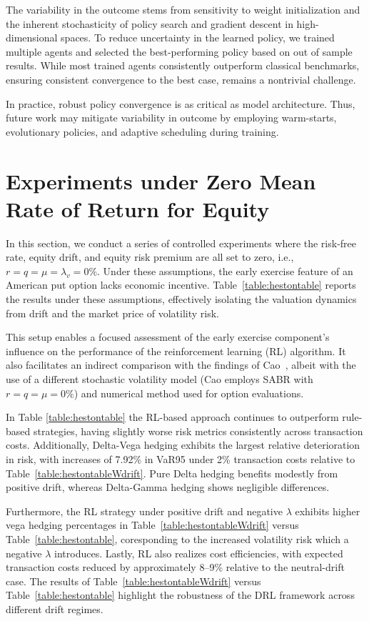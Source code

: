 \documentclass[a4paper,fleqn]{cas-dc}
\begin{document}
The variability in the outcome stems from sensitivity to weight initialization and the inherent stochasticity of policy search and gradient descent in high-dimensional spaces. To reduce uncertainty in the learned policy, we trained multiple agents and selected the best-performing policy based on out of sample results. While most trained agents consistently outperform classical benchmarks, ensuring consistent convergence to the best case, remains a nontrivial challenge. 

In practice, robust policy convergence is as critical as model architecture. Thus, future work may mitigate variability in outcome by employing warm-starts, evolutionary policies, and adaptive scheduling during training.


\section{Experiments under Zero Mean Rate of Return for Equity}\label{sec:experiments-with-zero-drift}

In this section, we conduct a series of controlled experiments where the risk-free rate, equity drift, and equity risk premium are all set to zero, i.e., $r=q=\mu=\lambda_{v}=0\%$. Under these assumptions, the early exercise feature of an American put option lacks economic incentive. Table~\ref{table:hestontable} reports the results under these assumptions, effectively isolating the valuation dynamics from drift and the market price of volatility risk.

This setup enables a focused assessment of the early exercise component’s influence on the performance of the reinforcement learning (RL) algorithm. It also facilitates an indirect comparison with the findings of Cao~\cite{DH_1}, albeit with the use of a different stochastic volatility model (Cao employs SABR with $r = q = \mu = 0\%$) and numerical method used for option evaluations.

In Table \ref{table:hestontable} the RL-based approach continues to outperform rule-based strategies, having slightly worse risk metrics consistently across transaction costs. Additionally, Delta-Vega hedging exhibits the largest relative deterioration in risk, with increases of 7.92\% in VaR95 under 2\% transaction costs relative to Table~\ref{table:hestontableWdrift}. Pure Delta hedging benefits modestly from positive drift, whereas Delta-Gamma hedging shows negligible differences.

Furthermore, the RL strategy under positive drift and negative $\lambda$ exhibits higher vega hedging percentages in Table~\ref{table:hestontableWdrift} versus Table~\ref{table:hestontable}, coresponding to the increased volatility risk which a negative $\lambda$ introduces. Lastly, RL also realizes cost efficiencies, with expected transaction costs reduced by approximately 8–9\% relative to the neutral-drift case. The results of Table~\ref{table:hestontableWdrift} versus Table~\ref{table:hestontable} highlight the robustness of the DRL framework across different drift regimes.
\end{document}
